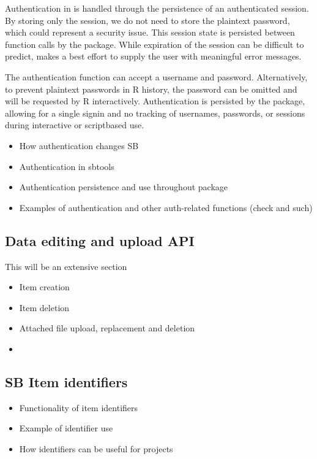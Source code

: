 Authentication in  is handled through the persistence of 
an authenticated session. By storing only the session, we do not need to 
store the plaintext password, which could represent a security issue. This
session state is persisted between function calls by the package. While  
expiration of the session can be difficult to predict, 
makes a best effort to supply the user with meaningful error messages.

The authentication function  can accept a username
and password. Alternatively, to prevent plaintext passwords in R history, 
the password can be omitted and will be requested by R interactively. 
Authentication is persisted by the package, allowing for a single signin
and no tracking of usernames, passwords, or sessions during interactive or
scriptbased use. 



\begin{itemize}
	\item{How authentication changes SB}
	\item{Authentication in sbtools}
	\item{Authentication persistence and use throughout package}
	\item{Examples of authentication and other auth-related functions (check and such)}
\end{itemize}

\subsection{Data editing and upload API}
This will be an extensive section
\begin{itemize}
	\item{Item creation}
	\item{Item deletion}
	\item{Attached file upload, replacement and deletion}
	\item{}
\end{itemize}

\subsection{SB Item identifiers}
\begin{itemize}
	\item{Functionality of item identifiers}
	\item{Example of identifier use}
	\item{How identifiers can be useful for projects}
\end{itemize}
